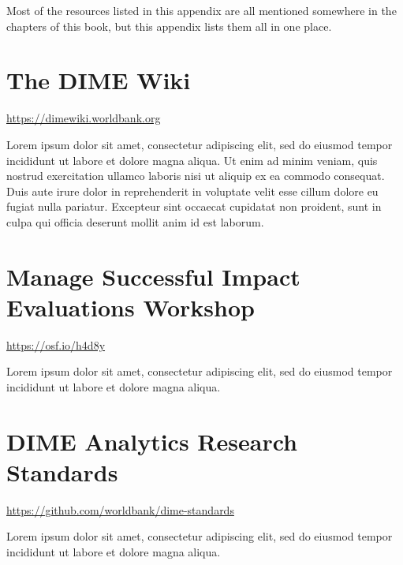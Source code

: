 
\begin{fullwidth}

Most of the resources listed in this appendix are all mentioned somewhere in the chapters of this book, but this appendix lists them all in one place.

\end{fullwidth}


\filbreak
\section{The DIME Wiki}
\url{https://dimewiki.worldbank.org}
\vspace{\baselineskip}

\noindent Lorem ipsum dolor sit amet, consectetur adipiscing elit, sed do eiusmod tempor incididunt ut labore et dolore magna aliqua. Ut enim ad minim veniam, quis nostrud exercitation ullamco laboris nisi ut aliquip ex ea commodo consequat. Duis aute irure dolor in reprehenderit in voluptate velit esse cillum dolore eu fugiat nulla pariatur. Excepteur sint occaecat cupidatat non proident, sunt in culpa qui officia deserunt mollit anim id est laborum.


\filbreak
\section{Manage Successful Impact Evaluations Workshop}
\url{https://osf.io/h4d8y}
\vspace{\baselineskip}

\noindent Lorem ipsum dolor sit amet, consectetur adipiscing elit, sed do eiusmod tempor incididunt ut labore et dolore magna aliqua.


\filbreak
\section{DIME Analytics Research Standards}
\url{https://github.com/worldbank/dime-standards}
\vspace{\baselineskip}

\noindent Lorem ipsum dolor sit amet, consectetur adipiscing elit, sed do eiusmod tempor incididunt ut labore et dolore magna aliqua.

